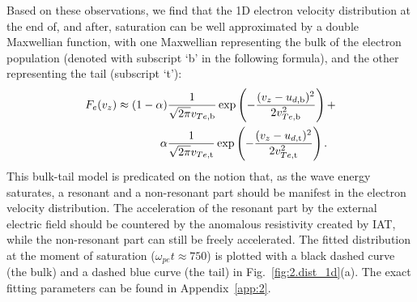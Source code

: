 \documentclass[%
 reprint,
 amsmath,
 amssymb,
 aps,
 prx,
floatfix,
superscriptaddress
]{revtex4-2}
\begin{document}
Based on these observations, we find that the 1D electron velocity distribution at the end of, and after, saturation can be well approximated by a double Maxwellian function, with one Maxwellian representing the bulk of the electron population (denoted with subscript `b' in the following formula), and the other representing the tail (subscript `t'):
\begin{align}
\label{eq:double_max}
\begin{split}
    F_e(v_z) \approx (1-\alpha) & \frac{1}{\sqrt{2\pi}v_{Te,\rm{b}}} \exp \left(-\frac{(v_z-u_{d, \rm{b}})^2}{2v_{Te,\rm{b}}^2}\right) +\\
\alpha & \frac{1}{\sqrt{2\pi}v_{Te,\rm{t}}} \exp \left(-\frac{(v_z-u_{d,\rm{t}})^2}{2v_{Te,\rm{t}}^2}\right).
\end{split}
\end{align}
This bulk-tail model is predicated on the notion that, as the wave energy saturates, a resonant and a non-resonant part should be manifest in the electron velocity distribution.
The acceleration of the resonant part by the external electric field should be countered by the anomalous resistivity created by IAT, while the non-resonant part can still be freely accelerated. 
The fitted distribution at the moment of saturation ($\omega_{pe}t \approx 750$) is plotted with a black dashed curve (the bulk) and a dashed blue curve (the tail) in Fig.~\ref{fig:2.dist_1d}(a). The exact fitting parameters can be found in Appendix~\ref{app:2}.
\end{document}
